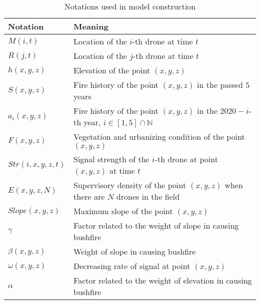 \documentclass[13pt]{ctexart} %
\begin{document}
\begin{table}[h]
    \centering
    \caption{Notations used in model construction}
    \vspace{3pt}
    \begin{tabular}{>{\centering\arraybackslash}p{6em}>{\centering\arraybackslash}p{30em}}
        \toprule %
        Notation         & Meaning                                 \\
        \midrule %
        $M
        (i,t)$           & Location of the $i$-th drone
        \uppercase\expandafter{\romannumeral1} at time $t$         \\
        $R
        (j,t)$           & Location of the $j$-th drone
        \uppercase\expandafter{\romannumeral2} at time $t$         \\
        $h
        (x,y,z)$         & Elevation of the point $(x,y,z)$        \\
        $S
        (x,y,z)$         & Fire history of the point $(x,y,z)$
        in the passed $5$ years                                    \\
        $a_i
        (x,y,z)$         & Fire history of the point $(x,y,z)$
        in the $2020-i$-th year,
        $i\in [1,5] \cap \mathbb{N} $                              \\
        $F(x,y,z) $      & Vegetation and urbanizing
        condition of the point$(x,y,z)$                            \\
        $Str(i,x,y,z,t)$ & Signal strength of the
        $i$-th drone at point $(x,y,z)$ at time $t$                \\
        $E
        (x,y,z,N)$       & Supervisory density of the
        point $(x,y,z)$ when there are $N$ drones in the field     \\
        $Slope
        (x,y,z)$         & Maximum slope of the point $(x,y,z)$    \\
        $\gamma$         & Factor related to the weight
        of slope in causing bushfire                               \\
        $\beta
        (x,y,z)$         & Weight of slope in causing bushfire     \\
        $\omega
        (x,y,z)$         & Decreasing rate of signal
        at point $(x,y,z)$                                         \\
        $\alpha$         & Factor related to the weight
        of elevation in causing bushfire                           \\

\end{tabular}
\end{table}
\end{document}
